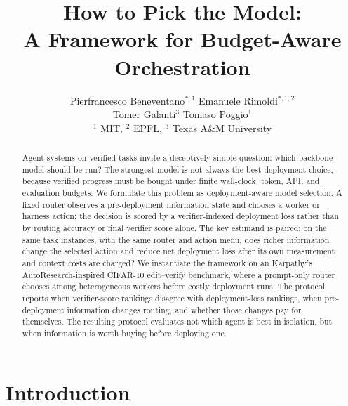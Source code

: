 \documentclass{article}
\title{How to Pick the Model:\\
A Framework for Budget-Aware Orchestration}
\author{%
  Pierfrancesco Beneventano$^{*,1}$ \quad Emanuele Rimoldi$^{*,1,2}$ \\
  Tomer Galanti$^3$ \quad Tomaso Poggio$^1$ \\
  $^1$ MIT, $^2$ EPFL, $^3$ Texas A\&M University
}
\begin{document}
\maketitle

\begin{abstract}
Agent systems on verified tasks invite a deceptively simple question: which backbone model should be run? The strongest model is not always the best deployment choice, because verified progress must be bought under finite wall-clock, token, API, and evaluation budgets. We formulate this problem as deployment-aware model selection. A fixed router observes a pre-deployment information state and chooses a worker or harness action; the decision is scored by a verifier-indexed deployment loss rather than by routing accuracy or final verifier score alone. The key estimand is paired: on the same task instances, with the same router and action menu, does richer information change the selected action and reduce net deployment loss after its own measurement and context costs are charged? We instantiate the framework on an Karpathy's AutoResearch-inspired CIFAR-10 edit--verify benchmark, where a prompt-only router chooses among heterogeneous workers before costly deployment runs. The protocol reports when verifier-score rankings disagree with deployment-loss rankings, when pre-deployment information changes routing, and whether those changes pay for themselves. The resulting protocol evaluates not which agent is best in isolation, but when information is worth buying before deploying one.
\end{abstract}

\section{Introduction}
\label{sec:intro}
\end{document}
